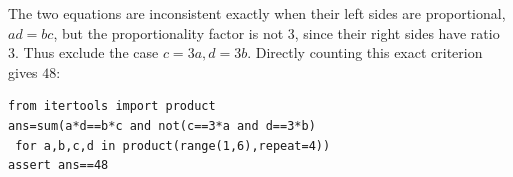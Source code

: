 The two equations are inconsistent exactly when their left sides are proportional, $ ad=bc $, but the proportionality factor is not 3, since their right sides have ratio 3. Thus exclude the case $ c=3a,d=3b $. Directly counting this exact criterion gives $\boxed{48}$:
\begin{verbatim}
from itertools import product
ans=sum(a*d==b*c and not(c==3*a and d==3*b)
 for a,b,c,d in product(range(1,6),repeat=4))
assert ans==48
\end{verbatim}
